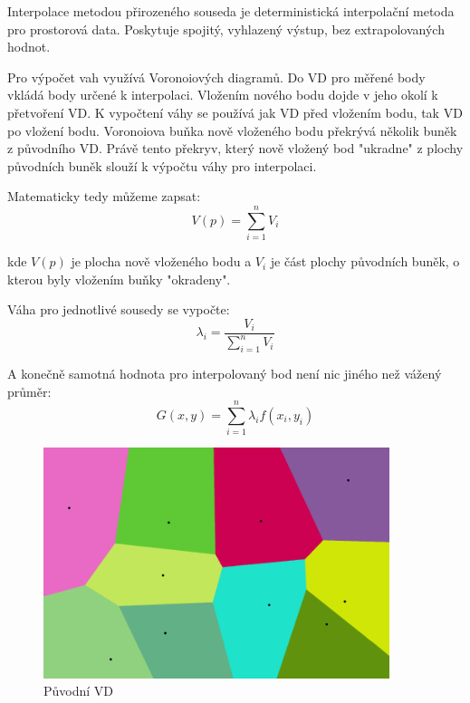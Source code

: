 \documentclass[12pt,a4paper]{article}
\begin{document}
Interpolace metodou přirozeného souseda je deterministická interpolační metoda pro prostorová data. Poskytuje spojitý, vyhlazený výstup, bez extrapolovaných hodnot. 

Pro výpočet vah využívá Voronoiových diagramů. Do VD pro měřené body vkládá body určené k interpolaci. Vložením nového bodu dojde v jeho okolí k přetvoření VD. K vypočtení váhy se používá jak VD před vložením bodu, tak VD po vložení bodu. Voronoiova buňka nově vloženého bodu překrývá několik buněk z původního VD. Právě tento překryv, který nově vložený bod "ukradne" z plochy původních buněk slouží k výpočtu váhy pro interpolaci.

\bigskip
Matematicky tedy můžeme zapsat:
\newline
$$V(p)=\sum_{i=1}^n V_i$$

kde $V(p)$ je plocha nově vloženého bodu a $V_i$ je část plochy původních buněk, o kterou byly vložením buňky "okradeny".

\bigskip
Váha pro jednotlivé sousedy se vypočte:
\newline
$$\lambda_i = \frac{V_i}{\sum_{i=1}^n V_i}$$

\bigskip
A konečně samotná hodnota pro interpolovaný bod není nic jiného než vážený průměr:
\newline
$$G(x,y) = \sum_{i=1}^{n} \lambda_i  f(x_i, y_i)$$

\newpage
\begin{figure}[h!]
\centering
\includegraphics[width=0.9\textwidth]{../img/canvas_0.png}
\caption{Původní VD}
\label{fig:fig:canvas0}
\end{figure}
\end{document}
